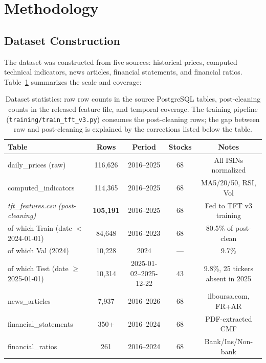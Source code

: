 \documentclass[conference]{IEEEtran}
\begin{document}
\section{Methodology}\label{sec:methodology}

\subsection{Dataset Construction}

The dataset was constructed from five sources: historical prices, computed technical indicators, news articles, financial statements, and financial ratios. Table~\ref{tab:dataset} summarizes the scale and coverage:

\begin{table}[htbp]
\centering
\caption{Dataset statistics: raw row counts in the source PostgreSQL tables, post-cleaning counts in the released feature file, and temporal coverage. The training pipeline (\texttt{training/train\_tft\_v3.py}) consumes the post-cleaning rows; the gap between raw and post-cleaning is explained by the corrections listed below the table.}
\label{tab:dataset}
\scriptsize
\setlength{\tabcolsep}{3pt}
\begin{tabular}{lcccc}
\toprule
\textbf{Table} & \textbf{Rows} & \textbf{Period} & \textbf{Stocks} & \textbf{Notes} \\
\midrule
daily\_prices (raw)             & 116{,}626 & 2016--2025 & 68 & All ISINs normalized \\
computed\_indicators            & 114{,}365 & 2016--2025 & 68 & MA5/20/50, RSI, Vol \\
\textit{tft\_features.csv (post-cleaning)} & \textbf{105{,}191} & 2016--2025 & 68 & Fed to TFT v3 training \\
\hspace{1em}of which Train (date $<$ 2024-01-01) & 84{,}648  & 2016--2023 & 68 & 80.5\% of post-clean \\
\hspace{1em}of which Val   (2024)               & 10{,}228  & 2024       & --- & 9.7\%  \\
\hspace{1em}of which Test  (date $\geq$ 2025-01-01) & 10{,}314 & 2025-01-02--2025-12-22 & 43 & 9.8\%, 25 tickers absent in 2025 \\
\midrule
news\_articles                  & 7{,}937   & 2016--2026 & 68 & ilboursa.com, FR+AR \\
financial\_statements           & 350+      & 2016--2024 & 68 & PDF-extracted CMF \\
financial\_ratios               & 261       & 2016--2024 & 68 & Bank/Ins/Non-bank \\
\bottomrule
\end{tabular}
\normalsize
\end{table}
\end{document}

